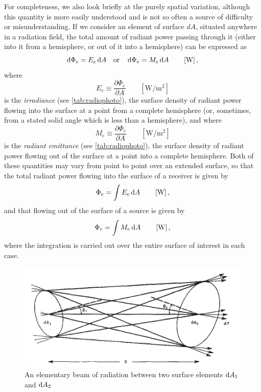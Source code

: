 For completeness, we also look briefly at the purely spatial variation, although
this quantity is more easily understood and is not so often a source of
difficulty
or misunderstanding. If we consider an element of surface $dA$, situated
anywhere
in a radiation field, the total amount of radiant power passing through it
(either
into it from a hemisphere, or out of it into a hemisphere) can be expressed as
\begin{equation*}
\mathop{}\!\mathrm{d}\Phi_e = E_e \mathop{}\!\mathrm{d} A \quad \textrm{or} \quad \mathop{}\!\mathrm{d}\Phi_e = M_e \mathop{}\!\mathrm{d} A
\qquad \left[\si{\watt}\right],
\end{equation*}
where
\begin{equation}\label{eqn:nicodemus4}
E_e \equiv \frac{\partial \Phi_e}{\partial A}
\qquad \left[\si{\watt\per\square\meter}\right]
\end{equation}
is the \textsl{irradiance} (see \cref{tab:radiophoto}), the surface density
of radiant power flowing into the surface at a point from a complete hemisphere
(or, sometimes, from a stated solid angle which is less than a hemisphere), and
where
\begin{equation}\label{eqn:nicodemus5}
M_e \equiv \frac{\partial \Phi_e}{\partial A}
\qquad \left[\si{\watt\per\square\meter}\right]
\end{equation}
is the \textsl{radiant emittance} (see \cref{tab:radiophoto}), the surface
density of radiant power flowing out of the surface at a point into a complete
hemisphere. Both of these quantities may vary from point to point over an
extended
surface, so that the total radiant power flowing into the surface of a receiver
is given by
\begin{equation}
\Phi_e = \int E_e \mathop{}\!\mathrm{d} A
\qquad \left[\si{\watt}\right],
\end{equation}
and that flowing out of the surface of a source is given by
\begin{equation}
\Phi_e = \int M_e \mathop{}\!\mathrm{d} A
\qquad \left[\si{\watt}\right],
\end{equation}
where the integration is carried out over the entire surface of interest in each case.

\begin{figure}
\begin{center}
\includegraphics{figures/nicodemus1963-fig2.pdf}
\end{center}
\caption{An elementary beam of radiation between two surface elements $\mathop{}\!\mathrm{d} A_1$ and $\mathop{}\!\mathrm{d} A_2$}
\label{fig:nicodemus2}
\end{figure}


